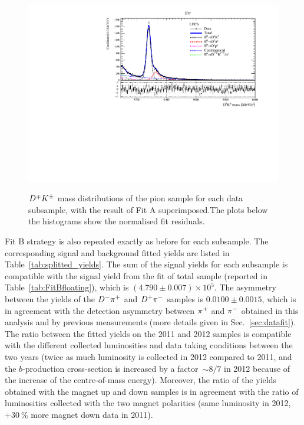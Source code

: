 \begin{figure}[htbp]
\begin{center}
		\includegraphics[width=0.48\linewidth]{03Massfit/figs/MDFitPlots_Bd_pip/MDFit_BeautyMass_Bd2DK_withPulls.pdf} \\
		\vspace{-2mm}
                \caption{$D^\mp K^\pm$ mass distributions of the pion sample for each data subsample, with the result of Fit A
                  superimposed.The plots below the histograms show the normalised fit residuals.
		\label{fig:splitfitK}}
	\end{center}
\end{figure}

Fit B strategy is also repeated exactly as before for each subsample. The
corresponding signal and background fitted yields are listed in
Table~\ref{tab:splitted_yields}. The sum of the signal yields for each subsample
is compatible with the signal yield from the fit of total sample (reported in
Table~\ref{tab:FitBfloating}), which is $(4.790\pm0.007)\times10^{5}$.
The asymmetry between the yields of the $D^-\pi^+$ and $D^+\pi^-$ samples 
is $0.0100\pm0.0015$, which is in agreement with the detection asymmetry between 
$\pi^+$ and $\pi^-$ obtained in this analysis and by previous measurements (more details given in Sec.~\ref{sec:datafit}).
The ratio between the fitted yields on the 2011 and 2012 samples is compatible with the different collected luminosities and data taking conditions 
between the two years (twice as much luminosity is collected in 2012 compared to 2011, and the $b$-production cross-section is increased by a factor~$\sim8/7$ in 2012 
because of the increase of the centre-of-mass energy).
Moreover, the ratio of the yields obtained with the magnet up and down samples is in agreement with the ratio of luminosities collected
with the two magnet polarities (same luminosity in 2012, $+30~\%$ more magnet down data in 2011).

